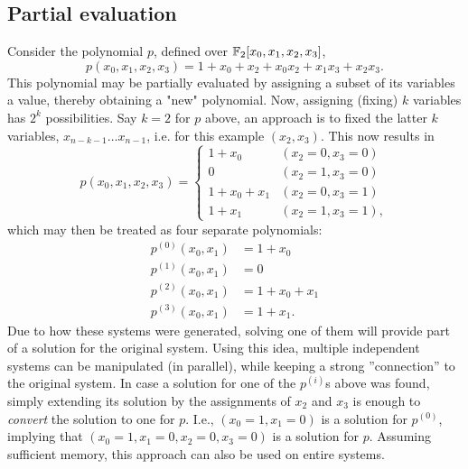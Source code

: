 \subsection{Partial evaluation} \label{sec:prereq:partial_eval}
Consider the polynomial $p$, defined over $\mathbb{F}_2[x_0,x_1,x_2,x_3]$,
$$
    p(x_0, x_1, x_2, x_3) = 1 + x_0 + x_2 + x_0x_2 + x_1x_3 + x_2x_3.
$$
This polynomial may be partially evaluated by assigning a subset of its variables a value, thereby obtaining a "new" polynomial. Now, assigning (fixing) $k$ variables has $2^k$ possibilities. Say $k = 2$ for $p$ above, an approach is to fixed the latter $k$ variables, $x_{n - k - 1} \dots x_{n - 1}$, i.e. for this example $(x_2,x_3)$. This now results in 
\begin{equation}
    p(x_0,x_1,x_2,x_3) = 
    \begin{cases}
        1 + x_0       & (x_2 = 0, x_3 = 0)\\
        0             & (x_2 = 1, x_3 = 0)\\
        1 + x_0 + x_1 & (x_2 = 0, x_3 = 1)\\
        1 + x_1       & (x_2 = 1, x_3 = 1),
    \end{cases}
\end{equation} 
which may then be treated as four separate polynomials:
\begin{equation*}
    \begin{split}
        p^{(0)}(x_0, x_1) &= 1 + x_0          \\
        p^{(1)}(x_0, x_1) &= 0                \\           
        p^{(2)}(x_0, x_1) &= 1 + x_0 + x_1    \\
        p^{(3)}(x_0, x_1) &= 1 + x_1.
    \end{split}
\end{equation*}
Due to how these systems were generated, solving one of them will provide part of a solution for the original system. Using this idea, multiple independent systems can be manipulated (in parallel), while keeping a strong ''connection'' to the original system. In case a solution for one of the $p^{(i)}$s above was found, simply extending its solution by the assignments of $x_2$ and $x_3$ is enough to \textit{convert} the solution to one for $p$. I.e., $(x_0 = 1, x_1 = 0)$ is a solution for $p^{(0)}$, implying that $(x_0 = 1, x_1 = 0, x_2 = 0, x_3 = 0)$ is a solution for $p$. Assuming sufficient memory, this approach can also be used on entire systems.

